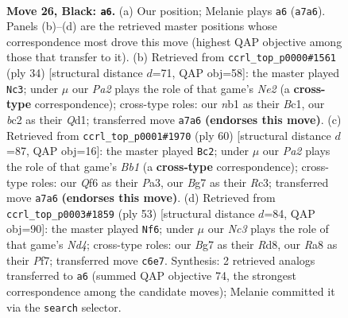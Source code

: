 \documentclass[11pt]{article}
\begin{document}
\clearpage

\begin{figure}[p]\centering
\begin{subfigure}{0.46\textwidth}\centering
\resizebox{\linewidth}{!}{%
\newchessgame
\chessboard[
  setfen={r5k1/pp3pb1/1nn2qp1/3p4/3P3p/7P/PPB2PPB/RN2Q1K1 b - - 3 26},
  showmover=false,
  pgfstyle=straightmove, color=movearrow, markmove={a7-a6}
]}
\caption{}
\end{subfigure}\hfill
\begin{subfigure}{0.46\textwidth}\centering
\resizebox{\linewidth}{!}{%
\newchessgame
\chessboard[
  setfen={b4rk1/2qp1ppp/1bn5/1p1pP3/5P2/1N6/1PP1N1PP/2BQ1R1K w - - 0 18},
  showmover=false,
  pgfstyle=straightmove, color=movearrow, markmove={e2-c3}
]}
\caption{}
\end{subfigure}
\\[4pt]
\begin{subfigure}{0.46\textwidth}\centering
\resizebox{\linewidth}{!}{%
\newchessgame
\chessboard[
  setfen={1q1r2k1/3n1pp1/p3p2p/1b6/pP2P3/P1R1QN1P/5PP1/1B4K1 w - - 8 31},
  showmover=false,
  pgfstyle=straightmove, color=movearrow, markmove={b1-c2}
]}
\caption{}
\end{subfigure}\hfill
\begin{subfigure}{0.46\textwidth}\centering
\resizebox{\linewidth}{!}{%
\newchessgame
\chessboard[
  setfen={3r2k1/5pp1/1p4bp/3nn1q1/P3p3/B1P1P2P/3NBPP1/2Q1R2K b - - 1 27},
  showmover=false,
  pgfstyle=straightmove, color=movearrow, markmove={d5-f6}
]}
\caption{}
\end{subfigure}
\caption{\textbf{Move 26, Black: \texttt{a6}.} (a) Our position; Melanie plays \texttt{a6} (\texttt{a7a6}). Panels (b)--(d) are the retrieved master positions whose correspondence most drove this move (highest QAP objective among those that transfer to it). (b) Retrieved from \texttt{ccrl\_top\_p0000\#1561} (ply 34) [structural distance $d$=71, QAP obj=58]: the master played \texttt{Nc3}; under $\mu$ our \emph{Pa2} plays the role of that game's \emph{Ne2} (a \textbf{cross-type} correspondence); cross-type roles: our \emph{n}b1 as their \emph{B}c1, our \emph{b}c2 as their \emph{Q}d1; transferred move \texttt{a7a6} \textbf{(endorses this move)}. (c) Retrieved from \texttt{ccrl\_top\_p0001\#1970} (ply 60) [structural distance $d$=87, QAP obj=16]: the master played \texttt{Bc2}; under $\mu$ our \emph{Pa2} plays the role of that game's \emph{Bb1} (a \textbf{cross-type} correspondence); cross-type roles: our \emph{Q}f6 as their \emph{P}a3, our \emph{B}g7 as their \emph{R}c3; transferred move \texttt{a7a6} \textbf{(endorses this move)}. (d) Retrieved from \texttt{ccrl\_top\_p0003\#1859} (ply 53) [structural distance $d$=84, QAP obj=90]: the master played \texttt{Nf6}; under $\mu$ our \emph{Nc3} plays the role of that game's \emph{Nd4}; cross-type roles: our \emph{B}g7 as their \emph{R}d8, our \emph{R}a8 as their \emph{P}f7; transferred move \texttt{c6e7}. Synthesis: 2 retrieved analogs transferred to \texttt{a6} (summed QAP objective 74, the strongest correspondence among the candidate moves); Melanie committed it via the \texttt{search} selector.}
\label{fig:thought-m51}
\end{figure}
\end{document}
